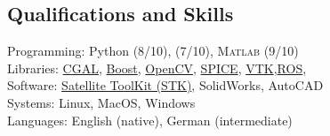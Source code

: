 \subsection*{Qualifications and Skills}
{}

Programming: Python (8/10), \CC (7/10), \textsc{Matlab} (9/10) \\
Libraries: \href{https://www.cgal.org/}{CGAL}, \href{https://www.boost.org/}{Boost}, \href{https:://opencv.org/}{OpenCV}, \href{https://naif.jpl.nasa.gov/naif/toolkit.html}{SPICE}, \href{https://www.vtk.org}{VTK},\href{http://www.ros.org}{ROS}, \\
Software: \href{http://www.agi.com/products/engineering-tools}{Satellite ToolKit (STK)},   SolidWorks, AutoCAD \\
Systems: Linux, MacOS, Windows \\
Languages: English (native), German (intermediate)
